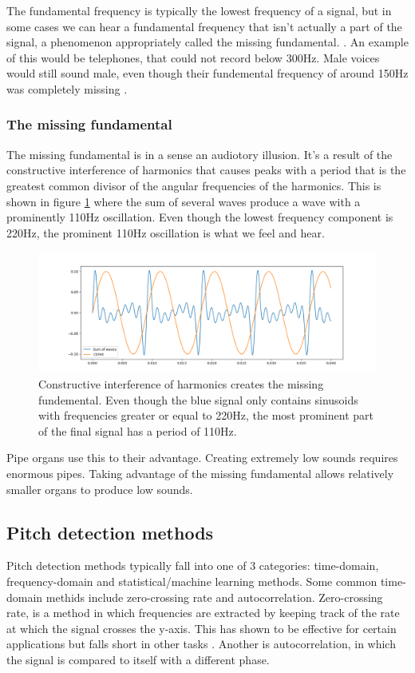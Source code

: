 The fundamental frequency is typically the lowest frequency of a signal, but in some cases we can hear a fundamental frequency that isn't actually a part of the signal, a phenomenon appropriately called the missing fundamental. . An example of this would be telephones, that could not record below 300Hz. Male voices would still sound male, even though their fundemental frequency of around 150Hz was completely missing .

\subsubsection{The missing fundamental}
The missing fundamental is in a sense an audiotory illusion. It's a result of the constructive interference of harmonics that causes peaks with a period that is the greatest common divisor of the angular frequencies of the harmonics. This is shown in figure \ref{fig:missingfund} where the sum of several waves produce a wave with a prominently 110Hz oscillation. Even though the lowest frequency component is 220Hz, the prominent 110Hz oscillation is what we feel and hear.

\begin{figure}[ht]
    \centering
    \includegraphics[width=\textwidth]{./images/missingfund.png}
    \caption{Constructive interference of harmonics creates the missing fundemental. Even though the blue signal only contains sinusoids with frequencies greater or equal to 220Hz, the most prominent part of the final signal has a period of 110Hz. \label{fig:missingfund}}
\end{figure}

Pipe organs use this to their advantage. Creating extremely low sounds requires enormous pipes. Taking advantage of the missing fundamental allows relatively smaller organs to produce low sounds.

\subsection{Pitch detection methods}
Pitch detection methods typically fall into one of 3 categories: time-domain, frequency-domain and statistical/machine learning methods. Some common time-domain methids include zero-crossing rate and autocorrelation. Zero-crossing rate, is a method in which frequencies are extracted by keeping track of the rate at which the signal crosses the y-axis. This has shown to be effective for certain applications but falls short in other tasks . Another is autocorrelation, in which the signal is compared to itself with a different phase. 

